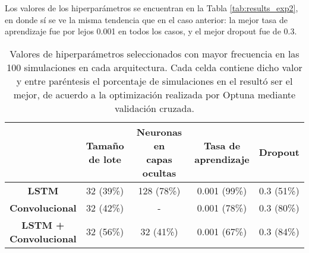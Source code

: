 \documentclass[../../main.tex]{subfiles}
\begin{document}
Los valores de los hiperparámetros se encuentran en la Tabla \ref{tab:results_exp2},
en donde sí se ve la misma tendencia que en el caso anterior: la mejor tasa de aprendizaje
fue por lejos 0.001 en todos los casos, y el mejor dropout fue de 0.3.


\begin{table}[H]
    \centering
    \renewcommand{\arraystretch}{1.2}
    \begin{tabular}{|c|c|c|c|c|}
        \hline
            & \makecell{\textbf{Tamaño}\\\textbf{de lote}}
            & \makecell{\textbf{Neuronas en}\\\textbf{capas ocultas}}
            & \makecell{\textbf{Tasa de}\\\textbf{aprendizaje}}
            & \textbf{Dropout} \\ \hline\hline
        \textbf{LSTM}
            & 32 (39\%) & 128 (78\%) & 0.001 (99\%) & 0.3 (51\%) \\ \hline
        \textbf{Convolucional}
            & 32 (42\%) & -          & 0.001 (78\%) & 0.3 (80\%) \\ \hline
        \makecell{\textbf{LSTM +}\\\textbf{Convolucional}}
            & 32 (56\%) & 32 (41\%)  & 0.001 (67\%) & 0.3 (84\%) \\
        \hline
    \end{tabular}
    \caption{Valores de hiperparámetros seleccionados con mayor frecuencia en las 100
    simulaciones en cada arquitectura. Cada celda contiene dicho valor y entre paréntesis
    el porcentaje de simulaciones en el resultó ser el mejor, de acuerdo a la optimización
    realizada por Optuna mediante validación cruzada.}
    \label{tab:hyperparams_exp2}
\end{table}
\end{document}
